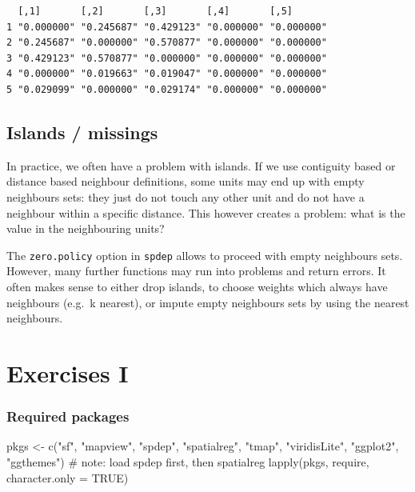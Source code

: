 \documentclass[
  letterpaper,
]{scrbook}
\newenvironment{Shaded}{\begin{snugshade}}{\end{snugshade}}
\newcommand{\AttributeTok}[1]{\textcolor[rgb]{0.40,0.45,0.13}{#1}}
\newcommand{\CommentTok}[1]{\textcolor[rgb]{0.37,0.37,0.37}{#1}}
\newcommand{\ConstantTok}[1]{\textcolor[rgb]{0.56,0.35,0.01}{#1}}
\newcommand{\FunctionTok}[1]{\textcolor[rgb]{0.28,0.35,0.67}{#1}}
\newcommand{\NormalTok}[1]{\textcolor[rgb]{0.00,0.23,0.31}{#1}}
\newcommand{\OtherTok}[1]{\textcolor[rgb]{0.00,0.23,0.31}{#1}}
\newcommand{\StringTok}[1]{\textcolor[rgb]{0.13,0.47,0.30}{#1}}
\begin{document}
\begin{verbatim}
  [,1]       [,2]       [,3]       [,4]       [,5]      
1 "0.000000" "0.245687" "0.429123" "0.000000" "0.000000"
2 "0.245687" "0.000000" "0.570877" "0.000000" "0.000000"
3 "0.429123" "0.570877" "0.000000" "0.000000" "0.000000"
4 "0.000000" "0.019663" "0.019047" "0.000000" "0.000000"
5 "0.029099" "0.000000" "0.029174" "0.000000" "0.000000"
\end{verbatim}

\hypertarget{islands-missings}{%
\section{Islands / missings}\label{islands-missings}}

In practice, we often have a problem with islands. If we use contiguity
based or distance based neighbour definitions, some units may end up
with empty neighbours sets: they just do not touch any other unit and do
not have a neighbour within a specific distance. This however creates a
problem: what is the value in the neighbouring units?

The \texttt{zero.policy} option in \texttt{spdep} allows to proceed with
empty neighbours sets. However, many further functions may run into
problems and return errors. It often makes sense to either drop islands,
to choose weights which always have neighbours (e.g.~k nearest), or
impute empty neighbours sets by using the nearest neighbours.


\hypertarget{exercises-i}{%
\chapter{Exercises I}\label{exercises-i}}

\hypertarget{required-packages-3}{%
\subsection*{Required packages}\label{required-packages-3}}

\begin{Shaded}
\begin{Highlighting}[]
\NormalTok{pkgs }\OtherTok{\textless{}{-}} \FunctionTok{c}\NormalTok{(}\StringTok{"sf"}\NormalTok{, }\StringTok{"mapview"}\NormalTok{, }\StringTok{"spdep"}\NormalTok{, }\StringTok{"spatialreg"}\NormalTok{, }\StringTok{"tmap"}\NormalTok{, }\StringTok{"viridisLite"}\NormalTok{,}
          \StringTok{"ggplot2"}\NormalTok{, }\StringTok{"ggthemes"}\NormalTok{) }\CommentTok{\# note: load spdep first, then spatialreg}
\FunctionTok{lapply}\NormalTok{(pkgs, require, }\AttributeTok{character.only =} \ConstantTok{TRUE}\NormalTok{)}
\end{Highlighting}
\end{Shaded}
\end{document}
